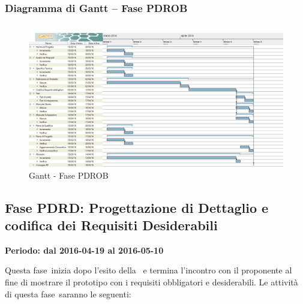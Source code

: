 \documentclass[../PianoProgetto.tex]{subfiles}
\begin{document}
		\subsubsection{Diagramma di Gantt – Fase PDROB}
			\begin{figure}[!h]
				\centering
				\includegraphics[width=\textwidth]{gantt_png/4-requisiti_obbligatori}
				\caption{Gantt - Fase PDROB}
				\label{fig:Gantt - Fase PDROB}
			\end{figure}
\newpage
	\subsection{Fase PDRD: Progettazione di Dettaglio e codifica dei Requisiti Desiderabili}
		\textbf{Periodo: dal 2016-04-19 al 2016-05-10}
		
		Questa fase\g\ inizia dopo l'esito della \revisionediprogettazione\ e termina l'incontro con il proponente al fine di mostrare il prototipo con i requisiti obbligatori e desiderabili. Le attività di questa fase\g\ saranno le seguenti:
\end{document}
